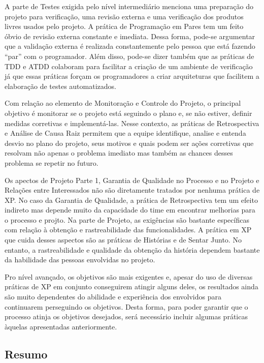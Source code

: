 A parte de Testes exigida pelo nível intermediário menciona uma
preparação do projeto para verificação, uma revisão externa e uma
verificação dos produtos livres usados pelo projeto. A prática de
Programação em Pares tem um feito óbvio de revisão externa constante e
imediata. Dessa forma, pode-se argumentar que a validação externa é
realizada constantemente pelo pessoa que está fazendo ``par'' com o
programador. Além disso, pode-se dizer também que as práticas de TDD e
ATDD colaboram para facilitar a criação de um ambiente de verificação
já que essas práticas forçam os programadores a criar arquiteturas que
facilitem a elaboração de testes automatizados.

Com relação ao elemento de Monitoração e Controle do Projeto, o
principal objetivo é monitorar se o projeto está seguindo o plano e,
se não estiver, definir medidas corretivas e implementá-las. Nesse
contexto, as práticas de Retrospectiva e Análise de Causa Raiz
permitem que a equipe identifique, analise e entenda desvio no plano
do projeto, seus motivos e quais podem ser ações corretivas que
resolvam não apenas o problema imediato mas também as chances desses
problema se repetir no futuro.

Os apectos de Projeto Parte 1, Garantia de Qualidade no Processo e no
Projeto e Relações entre Interessados não são diretamente tratados por
nenhuma prática de XP. No caso da Garantia de Qualidade, a prática de
Retrospectiva tem um efeito indireto mas depende muito da capacidade
do time em encontrar melhorias para o processo e projto. Na parte de
Projeto, as exigências são bastante específicas com relação à obtenção
e rastreabilidade das funcionalidades. A prática em XP que cuida
desses aspectos são as práticas de Histórias e de Sentar Junto. No
entanto, a rastreabilidade e qualidade da obtenção da história
dependem bastante da habilidade das pessoas envolvidas no projeto.

Pro nível avançado, os objetivos são mais exigentes e, apesar do uso
de diversas práticas de XP em conjunto conseguirem atingir alguns
deles, os resultados ainda são muito dependentes do abilidade e
experiência dos envolvidos para continuarem perseguindo os
objetivos. Desta forma, para poder garantir que o processo atinja os
objetivos desejados, será necessário incluir algumas práticas àquelas
apresentadas anteriormente.

\subsection{Resumo}
\label{sec:resumo-omm}

